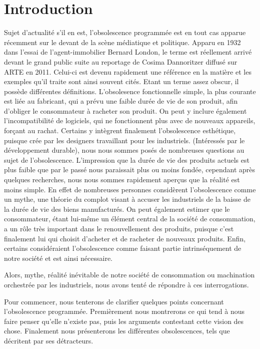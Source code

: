 \chapter*{Introduction}

	Sujet d'actualité s'il en est, l'obsolescence programmée est en tout cas apparue récemment sur le devant de la scène médiatique et politique. Apparu en 1932 dans l'essai de l'agent-immobilier Bernard London, le terme est réellement arrivé devant le grand public suite au reportage de Cosima Dannoritzer diffusé sur ARTE en 2011. Celui-ci est devenu rapidement une référence en la matière et les exemples qu'il traite sont ainsi souvent cités.
	Etant un terme assez obscur, il possède différentes définitions. L'obsolesence fonctionnelle simple, la plus courante est liée au fabricant, qui a prévu une faible durée de vie de son produit, afin d'obliger le consommateur à racheter son produit. On peut y inclure également l'incompatibilité de logiciels, qui ne fonctionnent plus avec de nouveaux appareils, forçant au rachat. Certains y intègrent finalement l'obsolescence esthétique, puisque crée par les designers travaillant pour les industriels.
	(Intéressés par le développement durable), nous nous sommes posés de nombreuses questions au sujet de l'obsolescence. L'impression que la durée de vie des produits actuels est plus faible que par le passé nous paraissait plus ou moins fondée, cependant après quelques recherches, nous nous sommes rapidement aperçus que la réalité est moins simple. En effet de nombreuses personnes considèrent l'obsolescence comme un mythe, une théorie du complot visant à accuser les industriels de la baisse de la durée de vie des biens manufacturés. On peut également estimer que le consommateur, étant lui-même un élément central de la société de consommation, a un rôle très important dans le renouvellement des produits, puisque c'est finalement lui qui choisit d'acheter et de racheter de nouveaux produits. Enfin, certains considéraient l'obsolescence comme faisant partie intrinséquement de notre société et est ainsi nécessaire.

	Alors, mythe, réalité inévitable de notre société de consommation ou machination orchestrée par les industriels, nous avons tenté de répondre à ces interrogations.

	Pour commencer, nous tenterons de clarifier quelques points concernant l'obsolescence programmée. Premièrement nous montrerons ce qui tend à nous faire penser qu'elle n'existe pas, puis les arguments contestant cette vision des chose. Finalement nous présenterons les différentes obsolescences, tels que décritent par ses détracteurs.


